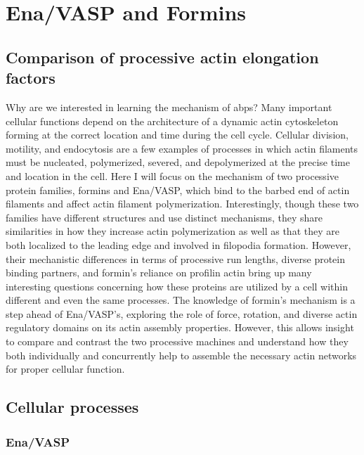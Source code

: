 \section{Ena/VASP and Formins}\label{ena-formin-review}

\subsection{Comparison of processive actin elongation factors}

Why are we interested in learning the mechanism of abps?
Many important cellular functions depend on the architecture of a dynamic actin cytoskeleton forming at the correct location and time during the cell cycle. Cellular division, motility, and endocytosis are a few examples of processes in which actin filaments must be nucleated, polymerized, severed, and depolymerized at the precise time and location in the cell. Here I will focus on the mechanism of two processive protein families, formins and Ena/VASP, which bind to the barbed end of actin filaments and affect actin filament polymerization. Interestingly, though these two families have different structures and use distinct mechanisms, they share similarities in how they increase actin polymerization as well as that they are both localized to the leading edge and involved in filopodia formation. However, their mechanistic differences in terms of processive run lengths, diverse protein binding partners, and formin's reliance on profilin actin bring up many interesting questions concerning how these proteins are utilized by a cell within different and even the same processes. The knowledge of formin's mechanism is a step ahead of Ena/VASP's, exploring the role of force, rotation, and diverse actin regulatory domains on its actin assembly properties. However, this allows insight to compare and contrast the two processive machines and understand how they both individually and concurrently help to assemble the necessary actin networks for proper cellular function. 

\subsection{Cellular processes}\label{ena-formin-cellular-processes}

\subsubsection{Ena/VASP}

